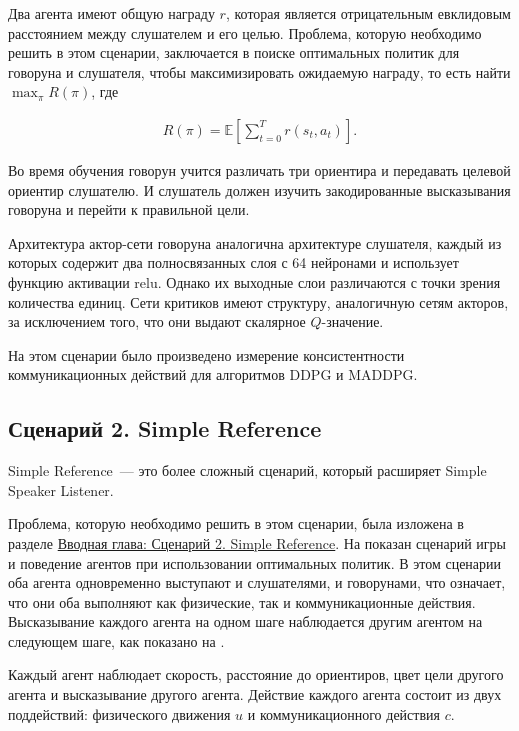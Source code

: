 Два агента имеют общую награду $r$, которая является отрицательным евклидовым расстоянием между слушателем и его целью. Проблема, которую необходимо решить в этом сценарии, заключается в поиске оптимальных политик для говоруна и слушателя, чтобы максимизировать ожидаемую награду, то есть найти $\max_{\pi}R(\pi)$, где

\begin{equation}
    \begin{multlined}
        R(\pi) = \mathbb{E}[\sum_{t=0}^{T}r(s_t, a_t)].
    \end{multlined}
\end{equation}

Во время обучения говорун учится различать три ориентира и передавать целевой ориентир слушателю. И слушатель должен изучить закодированные высказывания говоруна и перейти к правильной цели.

Архитектура актор-сети говоруна аналогична архитектуре слушателя, каждый из которых содержит два полносвязанных слоя с 64 нейронами и использует функцию активации relu. Однако их выходные слои различаются с точки зрения количества единиц. Сети критиков имеют структуру, аналогичную сетям акторов, за исключением того, что они выдают скалярное $Q$-значение.

На этом сценарии было произведено измерение консистентности коммуникационных действий для алгоритмов DDPG и MADDPG.

\subsection{Сценарий 2. Simple Reference} \label{exp-sr}

Simple Reference~--- это более сложный сценарий, который расширяет Simple Speaker Listener.

Проблема, которую необходимо решить в этом сценарии, была изложена в разделе \hyperref[intro-sr]{Вводная глава: Сценарий 2. Simple Reference}. На  показан сценарий игры и поведение агентов при использовании оптимальных политик. В этом сценарии оба агента одновременно выступают и слушателями, и говорунами, что означает, что они оба выполняют как физические, так и коммуникационные действия. Высказывание каждого агента на одном шаге наблюдается другим агентом на следующем шаге, как показано на .

Каждый агент наблюдает скорость, расстояние до ориентиров, цвет цели другого агента и высказывание другого агента. Действие каждого агента состоит из двух поддействий: физического движения $u$ и коммуникационного действия $c$.


